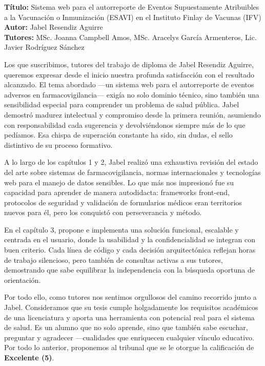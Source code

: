 \begin{opinion}

    \noindent\textbf{Título:} Sistema web para el autorreporte de Eventos Supuestamente Atribuibles a la Vacunación o Inmunización (ESAVI) en el Instituto Finlay de Vacunas (IFV)\\
    \textbf{Autor:} Jabel Resendiz Aguirre\\
    \textbf{Tutores:} MSc. Joanna Campbell Amos, MSc. Aracelys García Armenteros, Lic. Javier Rodríguez Sánchez
    
    \vspace{0.5cm}
    
    Los que suscribimos, tutores del trabajo de diploma de Jabel Resendiz Aguirre, queremos expresar desde el inicio nuestra profunda satisfacción con el resultado alcanzado. El tema abordado —un sistema web para el autorreporte de eventos adversos en farmacovigilancia— exigía no solo dominio técnico, sino también una sensibilidad especial para comprender un problema de salud pública. Jabel demostró madurez intelectual y compromiso desde la primera reunión, asumiendo con responsabilidad cada sugerencia y devolviéndonos siempre más de lo que pedíamos. Esa chispa de superación constante ha sido, sin dudas, el sello distintivo de su proceso formativo.
    
    A lo largo de los capítulos 1 y 2, Jabel realizó una exhaustiva revisión del estado del arte sobre sistemas de farmacovigilancia, normas internacionales y tecnologías web para el manejo de datos sensibles. Lo que más nos impresionó fue su capacidad para aprender de manera autodidacta: frameworks front-end, protocolos de seguridad y validación de formularios médicos eran territorios nuevos para él, pero los conquistó con perseverancia y método. 
    
    En el capítulo 3, propone e implementa una solución funcional, escalable y centrada en el usuario, donde la usabilidad y la confidencialidad se integran con buen criterio. Cada línea de código y cada decisión arquitectónica reflejan horas de trabajo silencioso, pero también de consultas activas a sus tutores, demostrando que sabe equilibrar la independencia con la búsqueda oportuna de orientación.
    
    Por todo ello, como tutores nos sentimos orgullosos del camino recorrido junto a Jabel. Consideramos que su tesis cumple holgadamente los requisitos académicos de una licenciatura y aporta una herramienta con potencial real para el sistema de salud. Es un alumno que no solo aprende, sino que también sabe escuchar, preguntar y agradecer —cualidades que enriquecen cualquier vínculo educativo. Por todo lo anterior, proponemos al tribunal que se le otorgue la calificación de \textbf{Excelente (5)}.
    

\end{opinion}
